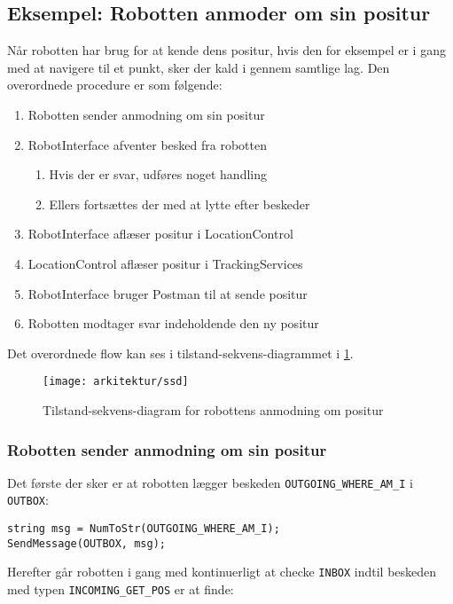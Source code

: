 \subsection{Eksempel: Robotten anmoder om sin positur}
Når robotten har brug for at kende dens positur, hvis den for eksempel er i gang med at navigere til et punkt, sker der kald i gennem samtlige lag.
Den overordnede procedure er som følgende:
\begin{enumerate}
\item{Robotten sender anmodning om sin positur}
\item{RobotInterface afventer besked fra robotten}
\begin{enumerate}
\item{Hvis der er svar, udføres noget handling}
\item{Ellers fortsættes der med at lytte efter beskeder}
\end{enumerate}
\item{RobotInterface aflæser positur i LocationControl}
\item{LocationControl aflæser positur i TrackingServices}
\item{RobotInterface bruger Postman til at sende positur}
\item{Robotten modtager svar indeholdende den ny positur}
\end{enumerate}
Det overordnede flow kan ses i tilstand-sekvens-diagrammet i \cref{flow:ssd}.

\begin{figure}[h]
\centering
\texttt{[image: arkitektur/ssd]}
\caption{Tilstand-sekvens-diagram for robottens anmodning om positur}
\label{flow:ssd}
\end{figure}

\subsubsection{Robotten sender anmodning om sin positur}
Det første der sker er at robotten lægger beskeden \lstinline[style=c]!OUTGOING_WHERE_AM_I! i \lstinline[style=c]!OUTBOX!:

\begin{lstlisting}[style=csmall,label=lst:whereami_request,caption=Robotten sender anmodning om positur]
string msg = NumToStr(OUTGOING_WHERE_AM_I);
SendMessage(OUTBOX, msg);
\end{lstlisting}

Herefter går robotten i gang med kontinuerligt at checke \lstinline[style=c]!INBOX! indtil beskeden med typen \lstinline[style=c]!INCOMING_GET_POS! er at finde:

